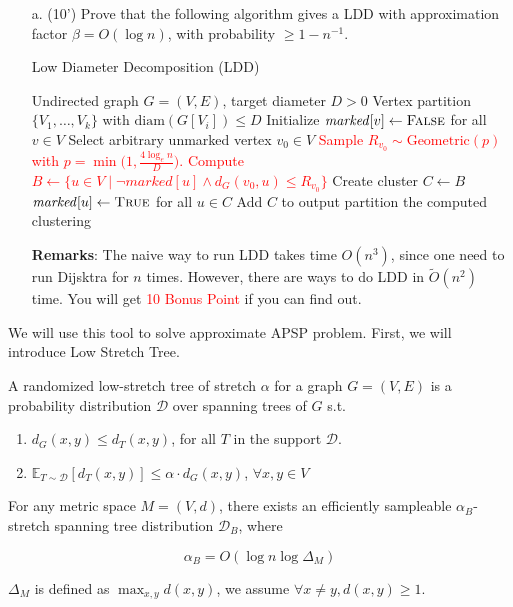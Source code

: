     \begin{itemize}
        \item [a. (10')] Prove that the following algorithm gives a LDD with approximation factor $\beta = O(\log n)$, with probability $\ge 1 - n ^ {-1}$.
\begin{algorithm}[H]
\caption{Low Diameter Decomposition (LDD)}
\label{alg:ldd}
\begin{algorithmic}[1]
\Require Undirected graph $G=(V,E)$, target diameter $D > 0$
\Ensure Vertex partition $\{V_1,\dots,V_k\}$ with $\mathrm{diam}(G[V_i]) \leq D$
\State Initialize $\mathit{marked}[v] \gets \textsc{False}$ for all $v \in V$
    \State Select arbitrary unmarked vertex $v_0 \in V$
    \State \textcolor{red}{Sample $R_{v_0} \sim \mathrm{Geometric}(p)$ with $p = \min\big(1, \frac{4\log_e n}{D}\big)$.}
    \State \textcolor{red}{Compute $B \gets \{u \in V \mid \lnot marked[u] \land  d_G(v_0,u) \leq R_{v_0}\}$}
    \State Create cluster $C \gets B$ 
    \State $\mathit{marked}[u] \gets \textsc{True}$ for all $u \in C$
    \State Add $C$ to output partition
\EndWhile
\State \Return the computed clustering
\end{algorithmic}
\end{algorithm}
\noindent \textbf{Remarks}: The naive way to run LDD takes time $O(n ^ 3)$, since one need to run Dijsktra for $n$ times. However, there are ways to do LDD in $\tilde{O}(n ^ 2)$ time. You will get \textcolor{red}{10 Bonus Point} if you can find out. 
    \end{itemize}


We will use this tool to solve approximate APSP problem. First, we will introduce Low Stretch Tree. 


\begin{definition}
    A randomized low-stretch tree of stretch  $\alpha$ for a graph $G=(V,E)$ is a probability distribution $\mathcal{D}$ over spanning trees of $G$ s.t.
    \begin{enumerate}
        \item $d_G(x, y) \le d_T(x, y)$, for all $T$ in the support $\mathcal{D}$.
        \item $\mathbb{E}_{T\sim \mathcal{D}}[d_T(x, y)] \le \alpha \cdot d_G(x,y)$, $\forall x, y \in V$
        
    \end{enumerate}
\end{definition}

\begin{theorem}\label{LST}
    For any metric space $M=(V, d)$, there exists an efficiently sampleable $\alpha_B$-stretch spanning tree distribution $\mathcal{D}_B$, where

$$
\alpha_B=O\left(\log n \log \Delta_M\right)
$$

$\Delta_M$ is defined as $\max_{x, y} d(x, y)$, we assume $\forall x\neq y, d(x, y) \ge 1$. 

\end{theorem}

